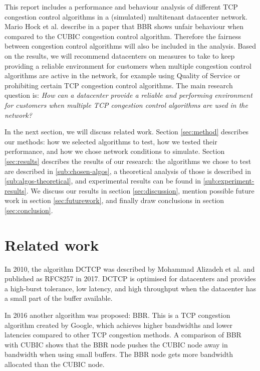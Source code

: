 \documentclass{article}
\begin{document}
This report includes a performance and behaviour analysis of different TCP
congestion control algorithms in a (simulated) multitenant datacenter network.
Mario Hock et al. describe in a paper that BBR shows unfair behaviour when
compared to the CUBIC congestion control
algorithm\cite{bbr-congestion-comparison}. Therefore the fairness between
congestion control algorithms will also be included in the analysis. Based on
the results, we will recommend datacenters on measures to take to keep
providing a reliable environment for customers when multiple congestion control
algorithms are active in the network, for example using Quality of Service or
prohibiting certain TCP congestion control algorithms. The main research question
is: {\it How can a datacenter provide a reliable and performing environment for
customers when multiple TCP congestion control algorithms are used in the
network?}

In the next section, we will discuss related work. Section \ref{sec:method}
describes our methods: how we selected algorithms to test, how we tested their
performance, and how we chose network conditions to simulate. Section
\ref{sec:results} describes the results of our research: the algorithms we
chose to test are described in \ref{sub:chosen-algos}, a theoretical analysis
of those is described in \ref{sub:algos-theoretical}, and experimental results
can be found in \ref{sub:experiment-results}. We discuss our results in section
\ref{sec:discussion}, mention possible future work in section
\ref{sec:futurework}, and finally draw conclusions in section \ref{sec:conclusion}.


\section{Related work}

In 2010, the algorithm DCTCP was described by Mohammad Alizadeh et
al.\cite{dctcp-congestion-original} and published as
RFC8257\cite{dctcp-congestion} in 2017. DCTCP is optimised for datacenters and
provides a high-burst tolerance, low latency, and high throughput when the
datacenter has a small part of the buffer available\cite{dctcp-congestion}.

In 2016 another algorithm was proposed: BBR. This is a TCP congestion algorithm
created by Google, which achieves higher bandwidths and lower latencies
compared to other TCP congestion methods\cite{bbr-congestion}. A comparison of
BBR with CUBIC\cite{bbr-congestion-comparison} shows that the BBR node pushes
the CUBIC node away in bandwidth when using small buffers. The BBR node gets
more bandwidth allocated than the CUBIC node.
\end{document}
